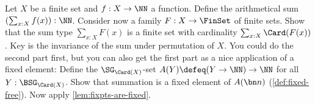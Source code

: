 \begin{xca}\label{xca:sum-over-finite-set}
Let $X$ be a finite set and $f:X\to\NN$ a function.
Define the arithmetical sum $(\sum_{x:X} f(x)):\NN$.
Consider now a family $F: X\to\FinSet$ of finite sets. Show that the sum type
$\sum_{x:X}F(x)$ is a finite set with cardinality $\sum_{x:X} \Card(F(x))$.
 Key is the invariance of the sum under permutation of $X$.
You could do the second part first, but you can also get the first part
as a nice application of a fixed element:
Define the $\SG_{\Card(X)}$-set $A(Y)\defeq(Y\to\NN)\to\NN$
for all $Y:\BSG_{\Card(X)}$. Show that summation is a fixed
element of $A(\bn n)$ (\cref{def:fixed-free}).
Now apply \cref{lem:fixpts-are-fixed}.
\end{xca}


